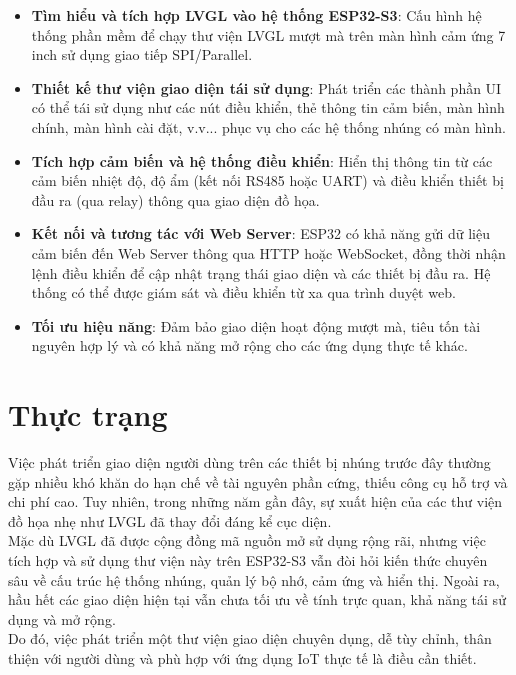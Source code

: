 \begin{itemize} 
\item \textbf{Tìm hiểu và tích hợp LVGL vào hệ thống ESP32-S3}: Cấu hình hệ thống phần mềm để chạy thư viện LVGL mượt mà trên màn hình cảm ứng 7 inch sử dụng giao tiếp SPI/Parallel. 
\item \textbf{Thiết kế thư viện giao diện tái sử dụng}: Phát triển các thành phần UI có thể tái sử dụng như các nút điều khiển, thẻ thông tin cảm biến, màn hình chính, màn hình cài đặt, v.v... phục vụ cho các hệ thống nhúng có màn hình. 
\item \textbf{Tích hợp cảm biến và hệ thống điều khiển}: Hiển thị thông tin từ các cảm biến nhiệt độ, độ ẩm (kết nối RS485 hoặc UART) và điều khiển thiết bị đầu ra (qua relay) thông qua giao diện đồ họa. 
\item \textbf{Kết nối và tương tác với Web Server}: ESP32 có khả năng gửi dữ liệu cảm biến đến Web Server thông qua HTTP hoặc WebSocket, đồng thời nhận lệnh điều khiển để cập nhật trạng thái giao diện và các thiết bị đầu ra. Hệ thống có thể được giám sát và điều khiển từ xa qua trình duyệt web.
\item \textbf{Tối ưu hiệu năng}: Đảm bảo giao diện hoạt động mượt mà, tiêu tốn tài nguyên hợp lý và có khả năng mở rộng cho các ứng dụng thực tế khác. 
\end{itemize}
\section{Thực trạng}
\tab Việc phát triển giao diện người dùng trên các thiết bị nhúng trước đây thường gặp nhiều khó khăn do hạn chế về tài nguyên phần cứng, thiếu công cụ hỗ trợ và chi phí cao. Tuy nhiên, trong những năm gần đây, sự xuất hiện của các thư viện đồ họa nhẹ như LVGL đã thay đổi đáng kể cục diện.\\ 
\tab Mặc dù LVGL đã được cộng đồng mã nguồn mở sử dụng rộng rãi, nhưng việc tích hợp và sử dụng thư viện này trên ESP32-S3 vẫn đòi hỏi kiến thức chuyên sâu về cấu trúc hệ thống nhúng, quản lý bộ nhớ, cảm ứng và hiển thị. Ngoài ra, hầu hết các giao diện hiện tại vẫn chưa tối ưu về tính trực quan, khả năng tái sử dụng và mở rộng.\\ 
\tab Do đó, việc phát triển một thư viện giao diện chuyên dụng, dễ tùy chỉnh, thân thiện với người dùng và phù hợp với ứng dụng IoT thực tế là điều cần thiết.

